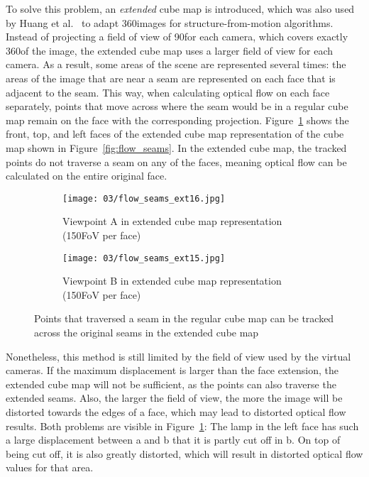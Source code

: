 To solve this problem, an \emph{extended} cube map is introduced, which was also used by Huang et al.\ \cite{6dof} to adapt 360\degree images for structure-from-motion algorithms. Instead of projecting a field of view of 90\degree for each camera, which covers exactly 360\degree of the image, the extended cube map uses a larger field of view for each camera. As a result, some areas of the scene are represented several times: the areas of the image that are near a seam are represented on each face that is adjacent to the seam. This way, when calculating optical flow on each face separately, points that move across where the seam would be in a regular cube map remain on the face with the corresponding projection. Figure~\ref{fig:flow_seams_ext} shows the front, top, and left faces of the extended cube map representation of the cube map shown in Figure~\ref{fig:flow_seams}. In the extended cube map, the tracked points do not traverse a seam on any of the faces, meaning optical flow can be calculated on the entire original face.

\begin{figure}
\centering
    \hfill
    \begin{subfigure}[t]{0.5\textwidth}            
            \centering
            \texttt{[image: 03/flow\_seams\_ext16.jpg]}
            \caption{Viewpoint A in extended cube map representation (150\degree FoV per face)}
    \end{subfigure}%
    \hfill
    \begin{subfigure}[t]{0.5\textwidth}
            \centering
            \texttt{[image: 03/flow\_seams\_ext15.jpg]}
            \caption{Viewpoint B in extended cube map representation (150\degree FoV per face)}
    \end{subfigure}
    \hfill
    \hfill
  \caption[Tracking points across seams in the extended cube map]{Points that traversed a seam in the regular cube map can be tracked across the original seams in the extended cube map} \label{fig:flow_seams_ext}
\end{figure}

Nonetheless, this method is still limited by the field of view used by the virtual cameras. If the maximum displacement is larger than the face extension, the extended cube map will not be sufficient, as the points can also traverse the extended seams. Also, the larger the field of view, the more the image will be distorted towards the edges of a face, which may lead to distorted optical flow results. Both problems are visible in Figure~\ref{fig:flow_seams_ext}: The lamp in the left face has such a large displacement between a and b that it is partly cut off in b. On top of being cut off, it is also greatly distorted, which will result in distorted optical flow values for that area.

